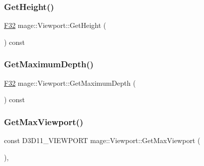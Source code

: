 \hypertarget{classmage_1_1_viewport_ac763e089bbff0ee3f67b47c0501637ef}{}\label{classmage_1_1_viewport_ac763e089bbff0ee3f67b47c0501637ef} 
\subsubsection{\texorpdfstring{Get\+Height()}{GetHeight()}}
{\footnotesize\ttfamily \hyperlink{namespacemage_aa97e833b45f06d60a0a9c4fc22ae02c0}{F32} mage\+::\+Viewport\+::\+Get\+Height (\begin{DoxyParamCaption}{ }\end{DoxyParamCaption}) const\hspace{0.3cm}{\ttfamily [noexcept]}}

\hypertarget{classmage_1_1_viewport_a1f6d41353b7f78afbd6b548d94c13752}{}\label{classmage_1_1_viewport_a1f6d41353b7f78afbd6b548d94c13752} 
\subsubsection{\texorpdfstring{Get\+Maximum\+Depth()}{GetMaximumDepth()}}
{\footnotesize\ttfamily \hyperlink{namespacemage_aa97e833b45f06d60a0a9c4fc22ae02c0}{F32} mage\+::\+Viewport\+::\+Get\+Maximum\+Depth (\begin{DoxyParamCaption}{ }\end{DoxyParamCaption}) const\hspace{0.3cm}{\ttfamily [noexcept]}}

\hypertarget{classmage_1_1_viewport_aec4a434cbb6f68805d02f1be6ecbf5a8}{}\label{classmage_1_1_viewport_aec4a434cbb6f68805d02f1be6ecbf5a8} 
\subsubsection{\texorpdfstring{Get\+Max\+Viewport()}{GetMaxViewport()}\hspace{0.1cm}{\footnotesize\ttfamily [1/5]}}
{\footnotesize\ttfamily const D3\+D11\+\_\+\+V\+I\+E\+W\+P\+O\+RT mage\+::\+Viewport\+::\+Get\+Max\+Viewport (\begin{DoxyParamCaption}{ }\end{DoxyParamCaption})\hspace{0.3cm}{\ttfamily [static]}, {\ttfamily [noexcept]}}

